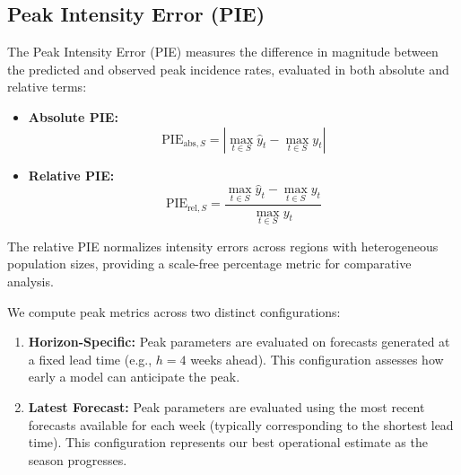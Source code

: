 \subsection{Peak Intensity Error (PIE)}
The Peak Intensity Error (PIE) measures the difference in magnitude between the predicted and observed peak incidence rates, evaluated in both absolute and relative terms:
\begin{itemize}
    \item \textbf{Absolute PIE:}
    \begin{equation}
    \text{PIE}_{\text{abs}, S} = \left| \max_{t \in S} \hat{y}_t - \max_{t \in S} y_t \right|
    \end{equation}
    \item \textbf{Relative PIE:}
    \begin{equation}
    \text{PIE}_{\text{rel}, S} = \frac{\max_{t \in S} \hat{y}_t - \max_{t \in S} y_t}{\max_{t \in S} y_t}
    \end{equation}
\end{itemize}
The relative PIE normalizes intensity errors across regions with heterogeneous population sizes, providing a scale-free percentage metric for comparative analysis.

We compute peak metrics across two distinct configurations:
\begin{enumerate}
    \item \textbf{Horizon-Specific:} Peak parameters are evaluated on forecasts generated at a fixed lead time (e.g., $h=4$ weeks ahead). This configuration assesses how early a model can anticipate the peak.
    \item \textbf{Latest Forecast:} Peak parameters are evaluated using the most recent forecasts available for each week (typically corresponding to the shortest lead time). This configuration represents our best operational estimate as the season progresses.
\end{enumerate}
